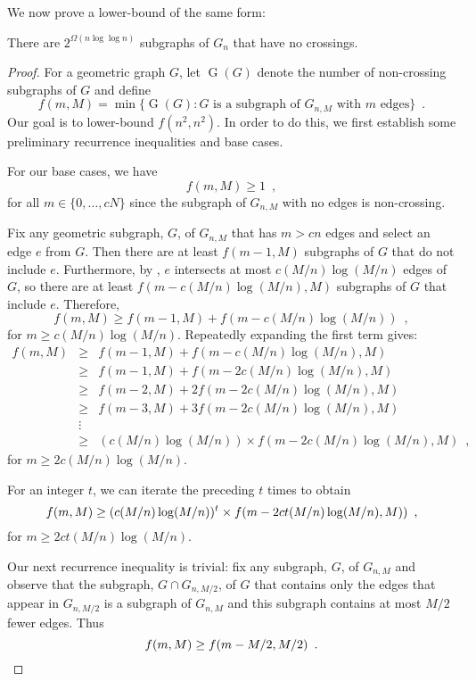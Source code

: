 \documentclass{patmorin}
\DeclareMathOperator{\ncs}{G}
\begin{document}
We now prove a lower-bound of the same form:

\begin{thm}
  There are $2^{\Omega(n\log\log n)}$ subgraphs of $G_n$ that have
  no crossings.
\end{thm}

\begin{proof}
For a geometric graph $G$, let $\ncs(G)$ denote the number of non-crossing
subgraphs of $G$ and define
\[
   f(m,M) = \min\{ \ncs(G) : \mbox{$G$ is a subgraph of $G_{n,M}$ with $m$ edges} \}
   \enspace . 
\]
Our goal is to lower-bound $f(n^2,n^2)$.  In order to do this, we first establish some preliminary recurrence inequalities and base cases.

For our base cases, we have 
\[ 
   f(m,M)\ge 1 \enspace ,
\]
for all $m\in\{0,\ldots,cN\}$ since the subgraph of $G_{n,M}$ with no
edges is non-crossing.

Fix any geometric subgraph, $G$, of $G_{n,M}$ that has $m> cn$
edges and select an edge $e$ from $G$. Then there are at least
$f(m-1,M)$ subgraphs of $G$ that do not include $e$.  Furthermore, by
, $e$ intersects at most $c(M/n)\log(M/n)$
edges of $G$, so there are at least $f(m-c(M/n)\log(M/n),M)$ subgraphs
of $G$ that include $e$.  Therefore,
\[  f(m,M) \ge f(m-1,M) + f(m-c(M/n)\log(M/n)) \enspace ,
\]
for $m\ge c(M/n)\log(M/n)$.  Repeatedly expanding the first term gives:
\begin{eqnarray*}
f(m,M) & \ge & f(m-1,M) + f(m-c(M/n)\log(M/n), M) \\
       & \ge & f(m-1,M) + f(m-2c(M/n)\log(M/n), M) \\
       & \ge & f(m-2,M) + 2f(m-2c(M/n)\log(M/n), M) \\
       & \ge & f(m-3,M) + 3f(m-2c(M/n)\log(M/n), M) \\
       & \vdots & \\
       & \ge & (c(M/n)\log(M/n))\times f(m-2c(M/n)\log(M/n), M) \enspace ,
\end{eqnarray*}
for $m\ge 2c(M/n)\log(M/n)$.

For an integer $t$, we can iterate the preceding $t$ times to obtain
\begin{equation}
   f(m,M) \ge (c(M/n)\log(M/n))^t\times f(m-2ct(M/n)\log(M/n), M)) \enspace ,
   \eqlabel{recur-a}
\end{equation} 
for $m\ge 2ct(M/n)\log(M/n)$.

Our next recurrence inequality is trivial: fix any subgraph, $G$,
of $G_{n,M}$ and observe that the subgraph, $G\cap G_{n,M/2}$, of $G$
that contains only the edges that appear in $G_{n,M/2}$ is a subgraph
of $G_{n,M}$ and this subgraph contains at most $M/2$ fewer edges.  Thus
\begin{equation}
  f(m,M) \ge f(m-M/2,M/2) \enspace .
  \eqlabel{recur-b}
\end{equation}


\end{proof}
\end{document}
